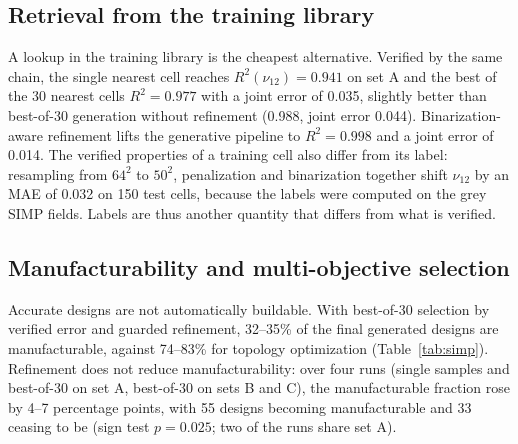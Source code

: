 \documentclass[a4paper,11pt]{article}
\newcommand{\nuot}{\nu_{12}}
\newcommand{\RR}{R^2}
\begin{document}
\subsection{Retrieval from the training library}
\label{sec:retr}
A lookup in the training library is the cheapest alternative. Verified by
the same chain, the single nearest cell reaches $\RR(\nuot)=0.941$ on set A
and the best of the 30 nearest cells $\RR=0.977$ with a joint error of 0.035,
slightly better than best-of-30 generation without refinement (0.988, joint
error 0.044). Binarization-aware refinement lifts the generative pipeline to
$\RR=0.998$ and a joint error of 0.014. The verified properties of a
training cell also differ from its label: resampling from $64^2$ to $50^2$,
penalization and binarization together shift $\nuot$ by an MAE of 0.032 on
150 test cells, because the labels were computed on the grey SIMP fields.
Labels are thus another quantity that differs from what is verified.

\subsection{Manufacturability and multi-objective selection}
\label{sec:multi}

Accurate designs are not automatically buildable. With best-of-30 selection
by verified error and guarded refinement, 32--35\% of the final generated
designs are manufacturable, against 74--83\% for topology optimization
(Table~\ref{tab:simp}). Refinement does not reduce manufacturability: over
four runs (single samples and best-of-30 on set A, best-of-30 on sets B and
C), the manufacturable fraction rose by 4--7 percentage points, with 55
designs becoming manufacturable and 33 ceasing to be (sign test $p=0.025$;
two of the runs share set A).
\end{document}
